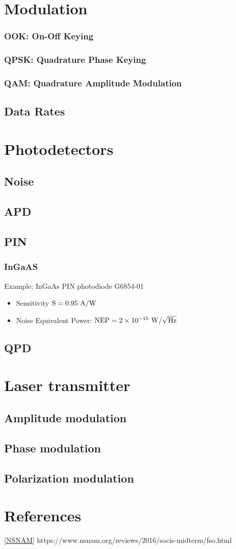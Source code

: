 \documentclass[a4paper]{article}
\begin{document}
\section{Modulation}
\subsubsection{OOK: On-Off Keying}
\subsubsection{QPSK: Quadrature Phase Keying}
\subsubsection{QAM: Quadrature Amplitude Modulation}
\subsection{Data Rates}

\section{Photodetectors}
\subsection{Noise}
\subsection{APD}
\subsection{PIN}
\subsubsection{InGaAS}

Example: InGaAs PIN photodiode G6854-01

\begin{itemize}
\item Sensitivity $\rm S = 0.95 \ \rm A/\rm W$
\item Noise Equivalent Power: $\rm{NEP} = 2\times 10^{-15} \rm \ W/\sqrt{\rm{Hz}}$
\end{itemize}

\subsection{QPD}

\section{Laser transmitter}
\subsection{Amplitude modulation}
\subsection{Phase modulation}
\subsection{Polarization modulation}


\section{References}
\ref{NSNAM}
https://www.nsnam.org/reviews/2016/socis-midterm/fso.html
\end{document}
